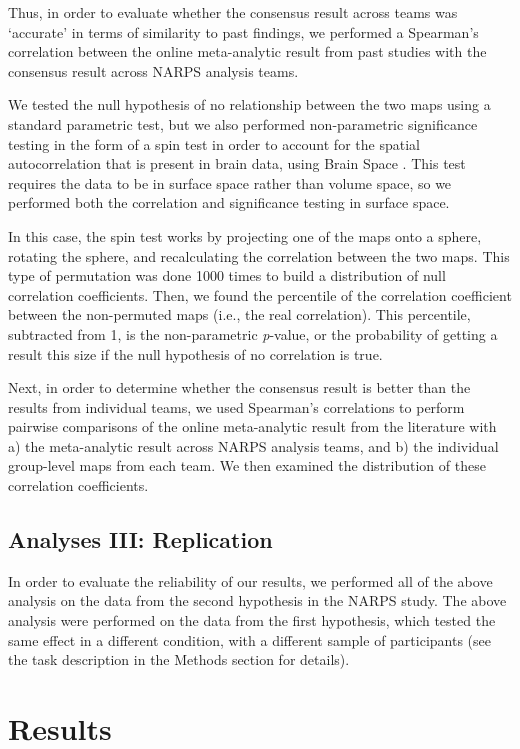 \documentclass[a4paper,doc,natbib]{apa6}
\begin{document}
Thus, in order to evaluate whether the consensus result across teams was `accurate' in terms of similarity to past findings, we performed a Spearman's correlation between the online meta-analytic result from past studies with the consensus result across NARPS analysis teams.

We tested the null hypothesis of no relationship between the two maps using a standard parametric test, but we also performed non-parametric significance testing in the form of a spin test \citep{alexander2018testing} in order to account for the spatial autocorrelation that is present in brain data, using Brain Space \citep{de2019brainspace}. This test requires the data to be in surface space rather than volume space, so we performed both the correlation and significance testing in surface space. 

In this case, the spin test works by projecting one of the maps onto a sphere, rotating the sphere, and recalculating the correlation between the two maps. This type of permutation was done 1000 times to build a distribution of null correlation coefficients. Then, we found the percentile of the correlation coefficient between the non-permuted maps (i.e., the real correlation). This percentile, subtracted from 1, is the non-parametric \textit{p}-value, or the probability of getting a result this size if the null hypothesis of no correlation is true.

Next, in order to determine whether the consensus result is better than the results from individual teams, we used Spearman's correlations to perform pairwise comparisons of the online meta-analytic result from the literature with a) the meta-analytic result across NARPS analysis teams, and b) the individual group-level maps from each team. We then examined the distribution of these correlation coefficients.

\subsection{Analyses III: Replication}
In order to evaluate the reliability of our results, we performed all of the above analysis on the data from the second hypothesis in the NARPS study. The above analysis were performed on the data from the first hypothesis, which tested the same effect in a different condition, with a different sample of participants (see the task description in the Methods section for details). 

\section{Results}
\end{document}
